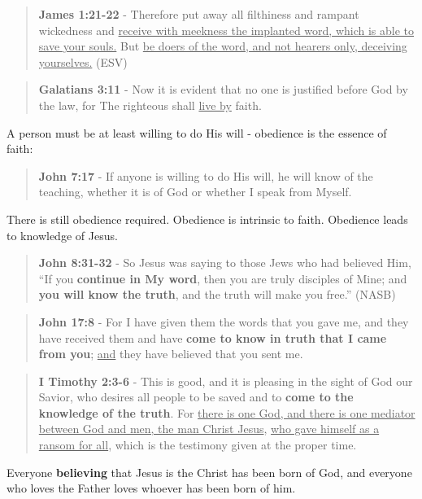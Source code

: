 \documentclass[11pt]{article}
\begin{document}
\begin{quote}
\textbf{James 1:21-22} - Therefore put away all filthiness and rampant wickedness and \uline{receive with meekness the implanted word, which is able to save your souls.} But \uline{be doers of the word, and not hearers only, deceiving yourselves.} (ESV)
\end{quote}

\begin{quote}
\textbf{Galatians 3:11} - Now it is evident that no one is justified before God by the law, for The righteous shall \uline{live by} faith.
\end{quote}

A person must be at least willing to do His will - obedience is the essence of faith:

\begin{quote}
\textbf{John 7:17} - If anyone is willing to do His will, he will know of the teaching, whether it is of God or whether I speak from Myself.
\end{quote}

There is still obedience required. Obedience is intrinsic to faith. Obedience leads to knowledge of Jesus.

\begin{quote}
\textbf{John 8:31-32} - So Jesus was saying to those Jews who had believed Him, “If you \textbf{continue in My word}, then you are truly disciples of Mine; and \textbf{you will know the truth}, and the truth will make you free.” (NASB)
\end{quote}

\begin{quote}
\textbf{John 17:8} - For I have given them the words that you gave me, and they have received them and have \textbf{come to know in truth that I came from you}; \uline{and} they have believed that you sent me.
\end{quote}

\begin{quote}
\textbf{I Timothy 2:3-6} - This is good, and it is pleasing in the sight of God our Savior, who desires all people to be saved and to \textbf{come to the knowledge of the truth}. For \uline{there is one God, and there is one mediator between God and men, the man Christ Jesus}, \uline{who gave himself as a ransom for all}, which is the testimony given at the proper time.
\end{quote}

Everyone \textbf{believing} that Jesus is the Christ has been born of God, and everyone who loves the Father loves whoever has been born of him.
\end{document}
